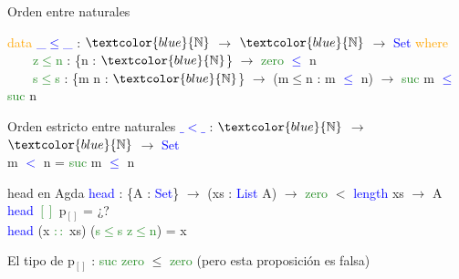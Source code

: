\documentclass[xcolor=dvipsnames]{beamer} %
\newcommand{\cf}[1]{\textcolor{blue}{#1}}
\newcommand{\ct}[1]{\textcolor{blue}{#1}}
\newcommand{\cc}[1]{\textcolor{ForestGreen}{#1}}
\newcommand{\ck}[1]{\textcolor{orange}{#1}}
\newcommand{\N}{\ct{\mathbb{N}}}
\newcommand{\ra}{\rightarrow}
\begin{document}
\begin{frame}

\begin{block}{Orden entre naturales}

\ck{data} \ct{\_$\leq$\_} : $\N$ $\ra$ $\N$ $\ra$ \ct{Set} \ck{where}\\
\ \ \ \ \cc{z$\leq$n} : \{n : $\N$\}                 $\ra$ \cc{zero}  \ct{$\leq$} n\\
\ \ \ \ \cc{s$\leq$s} : \{m n : $\N$\} $\ra$ (m$\leq$n : m \ct{$\leq$} n) $\ra$ \cc{suc} m \ct{$\leq$} \cc{suc} n

\end{block}

\begin{block}{Orden estricto entre naturales}
\cf{$\_<\_$} : $\N$ $\ra$ $\N$ $\ra$ \ct{Set}\\
m \cf{$<$} n = \cc{suc} m \cf{$\leq$} n
\end{block}

\begin{block}{head en Agda}
    \cf{head} : \{A : \ct{Set}\}  $\ra$ (xs : \ct{List} A) $\ra$ 
    \cc{zero} $<$ \ct{length} xs $\rightarrow$ A \\
    \cf{head} \cc{$[]$} p$_{[]}$ = ¿?\\
    \cf{head} (x \cc{$::$} xs) (\cc{s$\leq$s} \cc{z$\leq$n}) = x
  \end{block}  

\begin{block}{}
El tipo de p$_{[]}$ : \cc{suc} \cc{zero} $\leq$ \cc{zero} \pause (pero esta proposición es falsa)
\end{block}

\end{frame}
\end{document}
